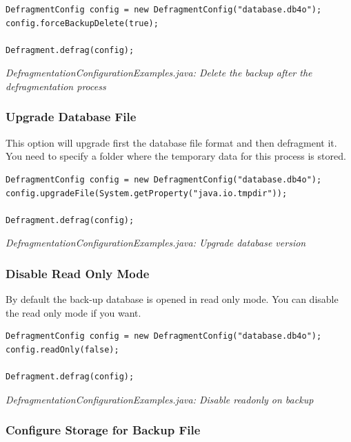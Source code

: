 \begin{lstlisting}
DefragmentConfig config = new DefragmentConfig("database.db4o");
config.forceBackupDelete(true);

Defragment.defrag(config);
\end{lstlisting}

{\small\itshape DefragmentationConfigurationExamples.java: Delete the backup after the defragmentation process\par}
\medskip

\subsubsection{Upgrade Database File}
\label{ref:advanced-topics-defragment-configuration-upgrade-db}

This option will upgrade first the database file format and then defragment it. You need to specify a folder where the temporary data for this process is stored.

\begin{lstlisting}
DefragmentConfig config = new DefragmentConfig("database.db4o");
config.upgradeFile(System.getProperty("java.io.tmpdir"));

Defragment.defrag(config);
\end{lstlisting}

{\small\itshape DefragmentationConfigurationExamples.java: Upgrade database version\par}
\medskip

\subsubsection{Disable Read Only Mode}
\label{ref:advanced-topics-defragment-configuration-disable-read-only}

By default the back-up database is opened in read only mode. You can disable the read only mode if you want.

\begin{lstlisting}
DefragmentConfig config = new DefragmentConfig("database.db4o");
config.readOnly(false);

Defragment.defrag(config);
\end{lstlisting}

{\small\itshape DefragmentationConfigurationExamples.java: Disable readonly on backup\par}
\medskip

\subsubsection{Configure Storage for Backup File}
\label{ref:advanced-topics-defragment-configuration-storage-backupdb}


